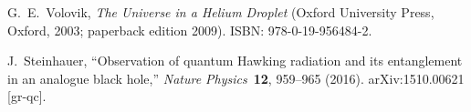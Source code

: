 %
%
%


G.~E.~Volovik, \emph{The Universe in a Helium Droplet} (Oxford University Press, Oxford, 2003; paperback edition 2009). ISBN: 978-0-19-956484-2.

J.~Steinhauer, ``Observation of quantum Hawking radiation and its entanglement in an analogue black hole,'' \emph{Nature Physics}\ \textbf{12}, 959--965 (2016). arXiv:1510.00621 [gr-qc].

